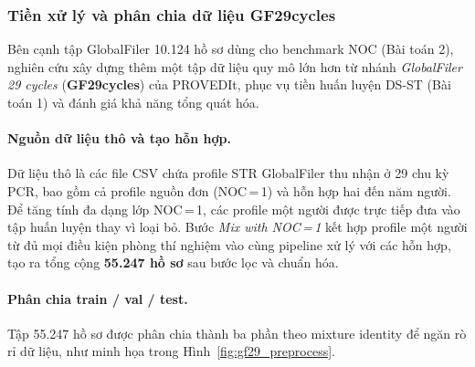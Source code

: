 \documentclass[12pt,a4paper]{article}
\begin{document}
\subsubsection{Tiền xử lý và phân chia dữ liệu GF29cycles}

Bên cạnh tập GlobalFiler 10.124 hồ sơ dùng cho benchmark NOC (Bài toán 2), nghiên cứu xây dựng thêm một tập dữ liệu quy mô lớn hơn từ nhánh \textit{GlobalFiler 29 cycles} (\textbf{GF29cycles}) của PROVEDIt, phục vụ tiền huấn luyện DS-ST (Bài toán 1) và đánh giá khả năng tổng quát hóa.

\paragraph{Nguồn dữ liệu thô và tạo hỗn hợp.}
Dữ liệu thô là các file CSV chứa profile STR GlobalFiler thu nhận ở 29 chu kỳ PCR, bao gồm cả profile nguồn đơn (NOC\,=\,1) và hỗn hợp hai đến năm người. Để tăng tính đa dạng lớp NOC\,=\,1, các profile một người được trực tiếp đưa vào tập huấn luyện thay vì loại bỏ. Bước \textit{Mix with NOC\,=\,1} kết hợp profile một người từ đủ mọi điều kiện phòng thí nghiệm vào cùng pipeline xử lý với các hỗn hợp, tạo ra tổng cộng \textbf{55.247 hồ sơ} sau bước lọc và chuẩn hóa.

\paragraph{Phân chia train / val / test.}
Tập 55.247 hồ sơ được phân chia thành ba phần theo mixture identity để ngăn rò rỉ dữ liệu, như minh họa trong Hình~\ref{fig:gf29_preprocess}.
\end{document}

